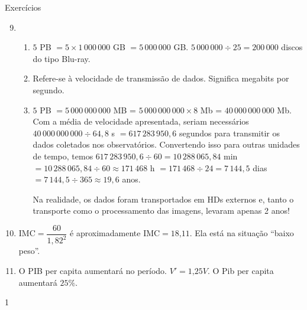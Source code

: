 \begin{answer}{Exercícios}
{\exerciselist
\begin{enumerate}\setcounter{enumi}{8}
\item 
\begin{enumerate}
\item \(5\) PB \(= 5\times 1\,000\,000\) GB \(= 5\,000\,000\) GB. \(5\,000\,000 \div 25 = 200\,000\) discos do tipo Blu-ray.

\item Refere-se à velocidade de transmissão de dados. Significa megabits por segundo.

\item \(5\) PB \(=5\,000\,000\,000\) MB = \(5\,000\,000\,000 \times 8\) Mb = \(40\,000\,000\,000\) Mb. Com a média de velocidade apresentada, seriam necessários \(40\,000\,000\,000 \div 64,8\) s \(= 617\,283\,950,6\) segundos para transmitir os dados coletados nos observatórios. Convertendo isso para outras unidades de tempo, temos \(617\,283\,950,6 \div 60 = 10\,288\,065,84\) min \(= 10\,288\,065,84 \div 60 \approx 171\,468\) h \(= 171\,468 \div 24 = 7\,144,5\) dias \(= 7\,144,5 \div 365 \approx 19,6\) anos.

Na realidade, os dados foram transportados em HDs externos e, tanto o transporte como o processamento das imagens, levaram apenas 2 anos!
\end{enumerate}

\item \(\text{IMC}=\dfrac{60}{1,82^2}\) é aproximadamente \(\text{IMC} = 18\text{,}11\). Ela está na situação “baixo peso”.

\item O PIB per capita aumentará no período.  \(V'=1\text{,}25V\). O Pib per capita aumentará \(25\%\).
\end{enumerate}
}{1}
\end{answer}
\clearmargin

